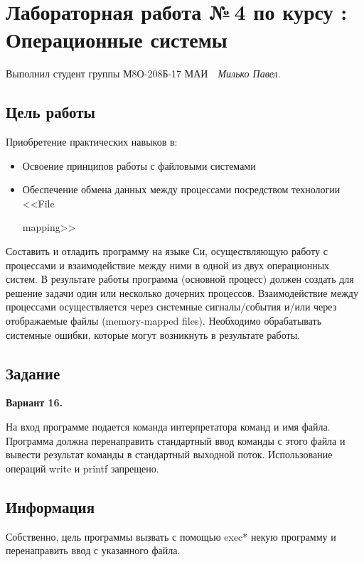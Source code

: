 \documentclass[12pt]{article}
\begin{document}
\section*{\centering Лабораторная работа №\,4 по курсу :\\ Операционные системы}

\noindent Выполнил студент группы М8О-208Б-17 МАИ \,\, \textit{Милько Павел}.

\subsection*{Цель работы}

\noindent Приобретение практических навыков в:
\begin{itemize}
\item  Освоение принципов работы с файловыми системами
\item Обеспечение обмена данных между процессами посредством технологии <<File 

 mapping>>
    
\end{itemize}

Составить и отладить программу на языке Си, осуществляющую работу с процессами и взаимодействие между ними в одной из двух операционных систем. В результате работы программа (основной процесс) должен создать для решение задачи один или несколько дочерних процессов. Взаимодействие между процессами осуществляется через системные сигналы/события и/или через отображаемые файлы (memory-mapped files).
Необходимо обрабатывать системные ошибки, которые могут возникнуть в результате работы.


\subsection*{Задание}
\textbf{Вариант 16.}

На вход программе подается команда интерпретатора команд и имя файла. Программа должна перенаправить стандартный ввод команды с этого файла и вывести результат команды в стандартный выходной поток. Использование операций write и printf запрещено.

\subsection*{Информация}

Собственно, цель программы вызвать с помощью exec* некую программу и перенаправить ввод с указанного файла.
\end{document}
